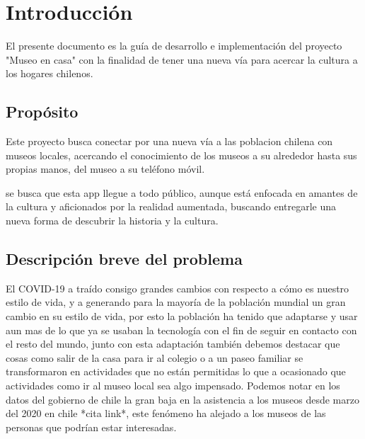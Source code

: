 \section{Introducción}
El presente documento es la guía de desarrollo e implementación del proyecto "Museo en casa" con la finalidad de tener una nueva vía para acercar la cultura a los hogares chilenos.

\subsection{Propósito}
Este proyecto busca conectar por una nueva vía a las poblacion chilena con museos locales, acercando el conocimiento de los museos a su alrededor hasta sus propias manos, del museo a su teléfono móvil.

se busca que esta app llegue a todo público, aunque está enfocada en amantes de la cultura y aficionados por la realidad aumentada, buscando entregarle una nueva forma de descubrir la historia y la cultura.

\subsection{Descripción breve del problema}
El COVID-19 a traído consigo grandes cambios con respecto a cómo es nuestro estilo de vida, y a generando para la mayoría de la población mundial un gran cambio en su estilo de vida, por esto la población ha tenido que adaptarse y usar aun mas de lo que ya se usaban la tecnología con el fin de seguir en contacto con el resto del mundo,  junto con esta adaptación también debemos destacar que cosas como salir de la casa para ir al colegio o a un paseo familiar se transformaron en actividades que no están permitidas lo que a ocasionado que actividades como ir al museo local sea algo impensado. Podemos notar en los datos del gobierno de chile la gran baja en la asistencia a los museos desde marzo del 2020 en chile *cita link*, este fenómeno ha alejado a los museos de las personas que podrían estar interesadas.
